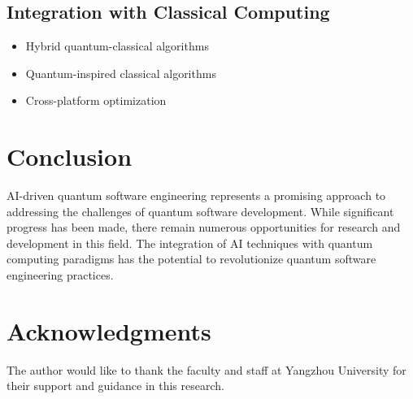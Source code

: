 \documentclass[12pt,a4paper]{article}
\begin{document}
\subsection{Integration with Classical Computing}
\begin{itemize}
    \item Hybrid quantum-classical algorithms
    \item Quantum-inspired classical algorithms
    \item Cross-platform optimization
\end{itemize}

\section{Conclusion}
AI-driven quantum software engineering represents a promising approach to addressing the challenges of quantum software development. While significant progress has been made, there remain numerous opportunities for research and development in this field. The integration of AI techniques with quantum computing paradigms has the potential to revolutionize quantum software engineering practices.

\section*{Acknowledgments}
The author would like to thank the faculty and staff at Yangzhou University for their support and guidance in this research.



\end{document}
